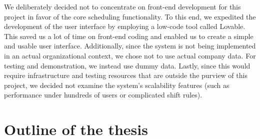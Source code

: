 \documentclass[nomenclature, english, bibtex]{kththesis}
\begin{document}
We deliberately decided not to concentrate on front-end development for this project in favor of the core scheduling functionality. To this end, we expedited the development of the user interface by employing a low-code tool called Lovable.  This saved us a lot of time on front-end coding and enabled us to create a simple and usable user interface.  Additionally, since the system is not being implemented in an actual organizational context, we chose not to use actual company data.  For testing and demonstration, we instead use dummy data.  Lastly, since this would require infrastructure and testing resources that are outside the purview of this project, we decided not examine the system's scalability features (such as performance under hundreds of users or complicated shift rules).

\section{Outline of the thesis}
\end{document}
